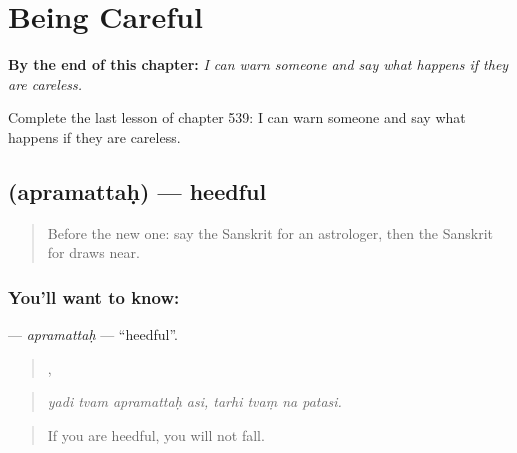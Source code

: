 
\chapter{Being Careful}
\label{ch:sa-being-careful}

\begin{chapteropening}
\textbf{By the end of this chapter:} \emph{I can warn someone and say what happens if they are careless.}

Complete the last lesson of chapter 539: I can warn someone and say what happens if they are careless.
\end{chapteropening}

\section[\texorpdfstring{\sk{अप्रमत्तः} (apramattaḥ)}{अप्रमत्तः (apramattaḥ)}]{ (apramattaḥ) — heedful}

\label{lesson:SA-C539-apramattah}



\begin{quote}
Before the new one: say the Sanskrit for an astrologer, then the Sanskrit for draws near.
\end{quote}

\subsection*{You'll want to know: }
\textbf{} — \emph{apramattaḥ} — \textquotedblleft{}heedful\textquotedblright{}.

\begin{quote}
   ,    
\end{quote}

\begin{quote}
\emph{yadi tvam apramattaḥ asi, tarhi tvaṃ na patasi.}
\end{quote}

\begin{quote}
If you are heedful, you will not fall.
\end{quote}

